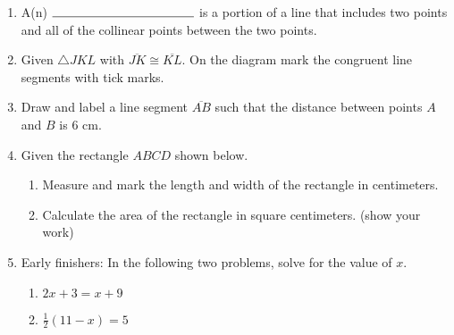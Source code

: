 \documentclass[12pt, twoside]{article}
\begin{document}
\begin{enumerate}
\item A(n) $\rule{4cm}{0.15mm}$ is a portion of a line that includes two points and all of the collinear points between the two points.\smallskip

\newpage
\item Given $\triangle JKL$ with $\overline{JK} \cong \overline{KL}$. On the diagram mark the congruent line segments with tick marks.
  \begin{center}
  \end{center}
  
\item Draw and label a line segment $\overline {AB}$ such that the distance between points $A$ and $B$ is 6 cm. \vspace{2cm}

  
\item Given the rectangle $ABCD$ shown below.
  \begin{enumerate}
    \item Measure and mark the length and width of the rectangle in centimeters.
    \item Calculate the area of the rectangle in square centimeters. (show your work)
  \end{enumerate}
  \vspace{2cm}
  \begin{center}
  \end{center}

\newpage
\item Early finishers: In the following two problems, solve for the value of $x$.
  \begin{multicols}{2}
    \begin{enumerate}
      \item   $2x+3=x + 9$ \vspace{6cm}
      \item   $\frac{1}{2}(11-x)=5$ \vspace{6cm}
    \end{enumerate}
  \end{multicols}
  \vspace{5cm}


\end{enumerate}
\end{document}
